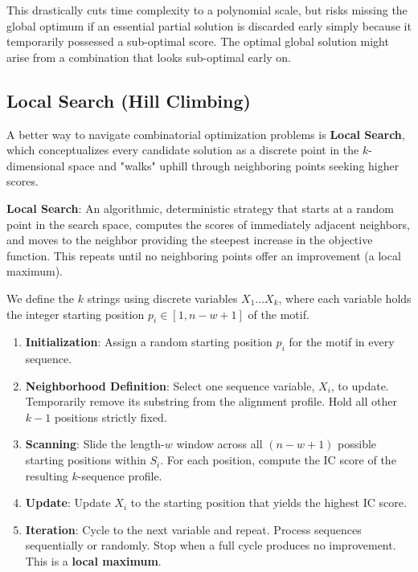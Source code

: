 This drastically cuts time complexity to a polynomial scale, but risks missing the global optimum if an essential partial solution is discarded early simply because it temporarily possessed a sub-optimal score. The optimal global solution might arise from a combination that looks sub-optimal early on.

\subsection{Local Search (Hill Climbing)}
A better way to navigate combinatorial optimization problems is \textbf{Local Search}, which conceptualizes every candidate solution as a discrete point in the $k$-dimensional space and "walks" uphill through neighboring points seeking higher scores.

\begin{important}
\textbf{Local Search}: An algorithmic, deterministic strategy that starts at a random point in the search space, computes the scores of immediately adjacent neighbors, and moves to the neighbor providing the steepest increase in the objective function. This repeats until no neighboring points offer an improvement (a local maximum).
\end{important}

We define the $k$ strings using discrete variables $X_1 \dots X_k$, where each variable holds the integer starting position $p_i \in [1, n-w+1]$ of the motif.

\begin{enumerate}
    \item \textbf{Initialization}: Assign a random starting position $p_i$ for the motif in every sequence.
    \item \textbf{Neighborhood Definition}: Select one sequence variable, $X_i$, to update. Temporarily remove its substring from the alignment profile. Hold all other $k-1$ positions strictly fixed.
    \item \textbf{Scanning}: Slide the length-$w$ window across all $(n-w+1)$ possible starting positions within $S_i$. For each position, compute the IC score of the resulting $k$-sequence profile.
    \item \textbf{Update}: Update $X_i$ to the starting position that yields the highest IC score.
    \item \textbf{Iteration}: Cycle to the next variable and repeat. Process sequences sequentially or randomly. Stop when a full cycle produces no improvement. This is a \textbf{local maximum}.
\end{enumerate}


